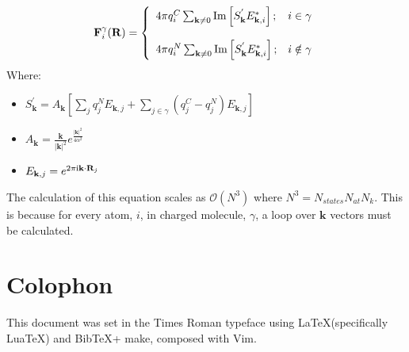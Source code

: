 \begin{equation}
	\mathbf{F}_{i}^{\gamma}(\mathbf{R}) =  \left\lbrace \begin{array}{lc}
	  4\pi q_{i}^{C} \sum_{\mathbf{k} \neq 0} \mathrm{Im}\left[ S^{'}_{\mathbf{k}} E_{\mathbf{k},i}^{*} \right]; & i \in \gamma\\\\
	
	4\pi q_{i}^{N} \sum_{\mathbf{k} \neq 0} \mathrm{Im}\left[ S^{'}_{\mathbf{k}} E_{\mathbf{k},i}^{*} \right];& i \notin \gamma
	\end{array}
	\right.
	\label{eq:AddSubForcesRecip}
\end{equation}
Where:
\begin{itemize}
  \item $S_{\mathbf{k}}^{'} = A_{\mathbf{k}} \left[\sum_{j} q_j^{N} E_{\mathbf{k}, j} + \sum_{j \in \gamma} \left(q_j^{C} - q_{j}^{N}\right) E_{\mathbf{k}, j}\right]$

  \item $A_{\mathbf{k}} = \frac{\mathbf{k}}{|\mathbf{k}|^2} e^{\frac{|\mathbf{k}|^2}{4 \alpha^2}}$

  \item $E_{\mathbf{k}, j} = e^{2 \pi \mathrm{i} \mathbf{k} \cdot \mathbf{R}_{j}}$
\end{itemize}
\noindent The calculation of this equation scales as $\mathcal{O}(N^3)$ where $N^3 = N_{states} N_{at} N_{k}$. This is because for every atom, $i$, in charged molecule, $\gamma$, a loop over $\mathbf{k}$ vectors must be calculated.

\chapter{Colophon}
\label{appendixlabel3}
This document was set in the Times Roman typeface using \LaTeX (specifically LuaTeX) and Bib\TeX + make, composed with Vim.
